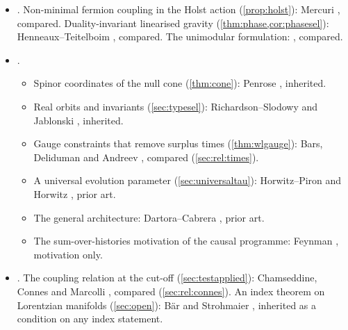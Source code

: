\begin{itemize}[leftmargin=1.6em]
  \begin{itemize}
  \item The rest-energy fraction of a Gaussian field (\cref{e7:prop:gauss}): the real Wishart eigenvalue law
  \cite{ZyczkowskiSommers01}, inherited.
  \item Oscillating birefringence and its washout (\cref{e7:sec:rate}; the duality--helicity relation is \cref{e7:prop:dualrot}): Fedderke, Graham and Rajendran \cite{FedderkeGrahamRajendran19},
  compared.
  \item Oscillation searches with atomic clocks (\cref{e7:sec:timeodd}): Van Tilburg et al.\ \cite{VanTilburg15}, compared.
  \item The ACT DR6 angle $0.215^\circ\pm0.074^\circ$: Diego-Palazuelos and Komatsu \cite{DiegoPalazuelosKomatsu26}, quoted with its
  authors' caution on systematics.
  \end{itemize}
\item {}. Non-minimal fermion coupling in the Holst action (\cref{prop:holst}): Mercuri \cite{Mercuri06}, compared.
Duality-invariant linearised gravity (\cref{thm:phase,cor:phasesel}): Henneaux--Teitelboim \cite{HenneauxTeitelboim05}, compared. The
unimodular formulation: \cite{HenneauxTeitelboim89}, compared.
\item {}.
  \begin{itemize}
  \item Spinor coordinates of the null cone (\cref{thm:cone}): Penrose \cite{Penrose60}, inherited.
  \item Real orbits and invariants (\cref{sec:typesel}): Richardson--Slodowy \cite{RichardsonSlodowy90} and Jablonski \cite{Jablonski12},
  inherited.
  \item Gauge constraints that remove surplus times (\cref{thm:wlgauge}): Bars, Deliduman and Andreev \cite{BarsDelidumanAndreev98}, compared
  (\cref{sec:rel:times}).
  \item A universal evolution parameter (\cref{sec:universaltau}): Horwitz--Piron \cite{HorwitzPiron73} and Horwitz \cite{Horwitz20}, prior art.
  \item The general architecture: Dartora--Cabrera \cite{DartoraCabrera10}, prior art.
  \item The sum-over-histories motivation of the causal programme: Feynman \cite{Feynman48}, motivation only.
  \end{itemize}
\item {}. The coupling relation at the cut-off (\cref{sec:testapplied}): Chamseddine, Connes and Marcolli
\cite{ChamseddineConnesMarcolli07}, compared (\cref{sec:rel:connes}). An index theorem on Lorentzian manifolds (\cref{sec:open}): B\"ar and
Strohmaier \cite{BarStrohmaier19}, inherited as a condition on any index statement.
\end{itemize}

